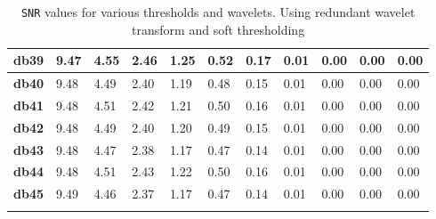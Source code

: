 \begin{tiny}
\begin{longtable}{|l|l|l|l|l|l|l|l|l|l|l|}
\textbf{db39}&9.47&4.55&2.46&1.25&0.52&0.17&0.01&0.00&0.00&0.00\\\hline
\textbf{db40}&9.48&4.49&2.40&1.19&0.48&0.15&0.01&0.00&0.00&0.00\\\hline
\textbf{db41}&9.48&4.51&2.42&1.21&0.50&0.16&0.01&0.00&0.00&0.00\\\hline
\textbf{db42}&9.48&4.49&2.40&1.20&0.49&0.15&0.01&0.00&0.00&0.00\\\hline
\textbf{db43}&9.48&4.47&2.38&1.17&0.47&0.14&0.01&0.00&0.00&0.00\\\hline
\textbf{db44}&9.48&4.51&2.43&1.22&0.50&0.16&0.01&0.00&0.00&0.00\\\hline
\textbf{db45}&9.49&4.46&2.37&1.17&0.47&0.14&0.01&0.00&0.00&0.00\\\hline
\caption{\texttt{SNR} values for various thresholds and wavelets. Using redundant wavelet transform and soft thresholding}
\label{tab:SNRRedSoft}
\end{longtable}
\end{tiny}